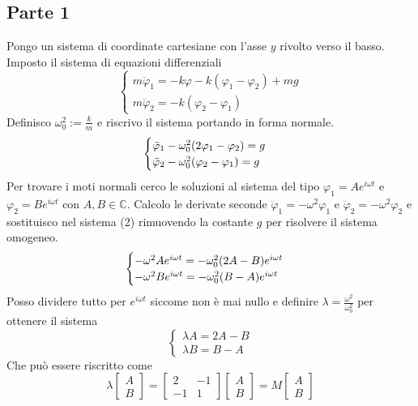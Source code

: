 \documentclass{scrartcl}
\renewcommand{\phi}{\varphi}
\begin{document}
\subsection*{Parte 1}
\setcounter{equation}{0}
    Pongo un sistema di coordinate cartesiane con l'asse \(y\) rivolto verso il basso.
    Imposto il sistema di equazioni differenziali
    \begin{equation}
        \begin{cases}
            m \ddot \phi_1 = -k \phi -k(\phi_1 - \phi_2) + mg \\
            m \ddot \phi_2 = -k (\phi_2 - \phi_1)
        \end{cases}
    \end{equation}
    Definisco \(\omega_0^2 := \frac{k}{m}\) e riscrivo il sistema portando in forma normale.
    \begin{equation}
        \begin{cases}
            \ddot \phi_1 - \omega_0^2 \qty(2 \phi_1 - \phi_2) = g \\
            \ddot \phi_2 - \omega_0^2 \qty(\phi_2 - \phi_1) = g
        \end{cases}
    \end{equation}
    Per trovare i moti normali cerco le soluzioni al sistema del tipo \(\phi_1 = A e^{i\omega t}\) e \(\phi_2 = B e^{i \omega t}\) con \(A, B \in \mathbb{C}\).
    Calcolo le derivate seconde \(\ddot \phi_1 = - \omega^2 \phi_1\) e \(\ddot \phi_2 = - \omega^2 \phi_2\) e sostituisco nel sistema (2) rimuovendo la costante \(g\) per risolvere il sistema omogeneo.
    \begin{equation}
        \begin{cases}
            - \omega^2 A e^{i \omega t} = - \omega_0^2 \qty(2A -B) e^{i \omega t} \\
            - \omega^2 B e^{i \omega t} = - \omega_0^2 \qty(B-A) e^{i \omega t}
        \end{cases}
    \end{equation}
    Posso dividere tutto per \(e^{i \omega t}\) siccome non è mai nullo e definire \(\lambda = \frac{\omega^2}{\omega_0^2}\) per ottenere il sistema
    \begin{equation}
        \begin{cases}
            \lambda A = 2A-B \\
            \lambda B = B-A
        \end{cases}
    \end{equation}
    Che può essere riscritto come
    \begin{equation}
        \lambda \begin{bmatrix} A \\ B \end{bmatrix} = \begin{bmatrix} 2 & -1 \\ -1 & 1 \end{bmatrix} \begin{bmatrix} A \\ B \end{bmatrix} = M \begin{bmatrix} A \\ B \end{bmatrix}
    \end{equation}
\end{document}
